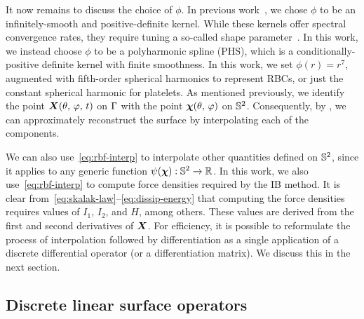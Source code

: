 It now remains to discuss the choice of $\phi$. In previous work~\cite{Shankar:2015km},
we chose $\phi$ to be an infinitely-smooth and positive-definite kernel. While these
kernels offer spectral convergence rates, they require tuning a so-called shape
parameter~\cite{Fasshauer:2007ui}. In this work, we instead choose $\phi$ to be a
polyharmonic spline (PHS), which is a conditionally-positive definite kernel with finite
smoothness. In this work, we set $\phi(r) = r^7$, augmented with fifth-order spherical
harmonics to represent RBCs, or just the constant spherical harmonic for platelets. As
mentioned previously, we identify the point $\boldsymbol{X}(\theta,\,\varphi,\,t)$ on $\Gamma$
with the point $\boldsymbol{\chi}(\theta,\,\varphi)$ on $\mathbb{S}^2$. Consequently, by , we can approximately reconstruct the surface by
interpolating each of the components. 

We can also use~\eqref{eq:rbf-interp} to interpolate other quantities defined on
$\mathbb{S}^2$, since it applies to any generic function $\psi(\boldsymbol{\chi}): \mathbb{S}^2 \to \mathbb{R}$.
In this work, we also use~\eqref{eq:rbf-interp} to compute force densities required by
the IB method. It is clear from~\eqref{eq:skalak-law}--\eqref{eq:dissip-energy} that
computing the force densities requires values of $I_1$, $I_2$, and $H$, among others.
These values are derived from the first and second derivatives of $\boldsymbol{X}$. For efficiency,
it is possible to reformulate the process of interpolation followed by differentiation as
a single application of a discrete differential operator (or a differentiation matrix).
We discuss this in the next section.

\subsection{Discrete linear surface operators}

